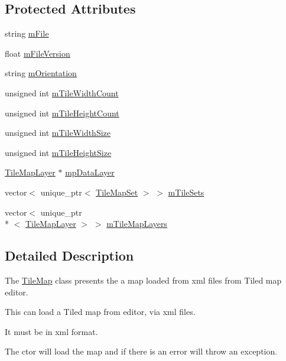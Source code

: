\subsection*{Protected Attributes}
\begin{DoxyCompactItemize}
\item 
string \hyperlink{class_tile_map_a16522fed3a3c05fd048d4627918dac4e}{m\-File}
\item 
float \hyperlink{class_tile_map_a6067e70fab16c65ecbb49ac3a939c2a1}{m\-File\-Version}
\item 
string \hyperlink{class_tile_map_a57c00e3034715bdd4feeb0ea6170829f}{m\-Orientation}
\item 
unsigned int \hyperlink{class_tile_map_aaee5f34ef457d19fa32768301ac81fc2}{m\-Tile\-Width\-Count}
\item 
unsigned int \hyperlink{class_tile_map_a2d6863a88f0ce522376c1d90c448a385}{m\-Tile\-Height\-Count}
\item 
unsigned int \hyperlink{class_tile_map_a98fe1a15d2a9fae5ecd3290fc9700661}{m\-Tile\-Width\-Size}
\item 
unsigned int \hyperlink{class_tile_map_a74b8c66dd13864f60cea068a8872499d}{m\-Tile\-Height\-Size}
\item 
\hyperlink{class_tile_map_layer}{Tile\-Map\-Layer} $\ast$ \hyperlink{class_tile_map_a8a388c1792d2170c8c5b27098f4ef439}{mp\-Data\-Layer}
\item 
vector$<$ unique\-\_\-ptr$<$ \hyperlink{class_tile_map_set}{Tile\-Map\-Set} $>$ $>$ \hyperlink{class_tile_map_ae9003055f192d71c5b5f9032852214a2}{m\-Tile\-Sets}
\item 
vector$<$ unique\-\_\-ptr\\*
$<$ \hyperlink{class_tile_map_layer}{Tile\-Map\-Layer} $>$ $>$ \hyperlink{class_tile_map_a954cc80053d31eab8a7950a36793f7b6}{m\-Tile\-Map\-Layers}
\end{DoxyCompactItemize}


\subsection{Detailed Description}
The \hyperlink{class_tile_map}{Tile\-Map} class presents the a map loaded from xml files from Tiled map editor. 

This can load a Tiled map from editor, via xml files.

It must be in xml format.

The ctor will load the map and if there is an error will throw an exception.

